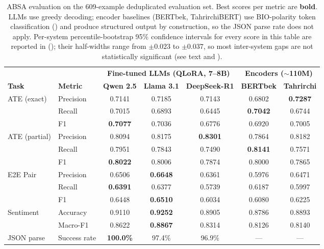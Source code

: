 \documentclass[bdcc,article,submit,moreauthors]{Definitions/mdpi}
\begin{document}
\begin{table}[t]
\centering
\caption{ABSA evaluation on the 609-example deduplicated evaluation set. Best scores per metric are \textbf{bold}. LLMs use greedy decoding; encoder baselines (BERTbek, TahrirchiBERT) use BIO-polarity token classification () and produce structured output by construction, so the JSON parse rate does not apply. Per-system percentile-bootstrap 95\% confidence intervals for every score in this table are reported in  (); their half-widths range from $\pm 0.023$ to $\pm 0.037$, so most inter-system gaps are not statistically significant (see text and ).}
\label{tab:absa_results}
\setlength{\tabcolsep}{2.5pt}
\small
\begin{tabular}{llccccc}
\toprule
& & \multicolumn{3}{c}{\textbf{Fine-tuned LLMs (QLoRA, 7--8B)}} & \multicolumn{2}{c}{\textbf{Encoders ($\sim$110M)}} \\
\cmidrule(lr){3-5}\cmidrule(lr){6-7}
\textbf{Task} & \textbf{Metric} & \textbf{Qwen 2.5} & \textbf{Llama 3.1} & \textbf{DeepSeek-R1} & \textbf{BERTbek} & \textbf{Tahrirchi} \\
\midrule
\multirow{3}{*}{ATE (exact)}
  & Precision & 0.7141 & 0.7185 & 0.7143 & 0.6802 & \textbf{0.7287} \\
  & Recall    & 0.7015 & 0.6893 & 0.6445 & \textbf{0.7042} & 0.6744 \\
  & F1        & \textbf{0.7077} & 0.7036 & 0.6776 & 0.6920 & 0.7005 \\
\midrule
\multirow{3}{*}{ATE (partial)}
  & Precision & 0.8094 & 0.8175 & \textbf{0.8301} & 0.7864 & 0.8182 \\
  & Recall    & 0.7951 & 0.7843 & 0.7490 & \textbf{0.8141} & 0.7571 \\
  & F1        & \textbf{0.8022} & 0.8006 & 0.7874 & 0.8000 & 0.7865 \\
\midrule
\multirow{3}{*}{E2E Pair}
  & Precision & 0.6506 & \textbf{0.6648} & 0.6361 & 0.5976 & 0.6471 \\
  & Recall    & \textbf{0.6391} & 0.6377 & 0.5739 & 0.6187 & 0.5997 \\
  & F1        & 0.6448 & \textbf{0.6510} & 0.6034 & 0.6080 & 0.6225 \\
\midrule
\multirow{2}{*}{Sentiment}
  & Accuracy  & 0.9110 & \textbf{0.9252} & 0.8905 & 0.8786 & 0.8893 \\
  & Macro-F1  & 0.8622 & \textbf{0.8867} & 0.8314 & 0.8126 & 0.8140 \\
\midrule
JSON parse & Success rate & \textbf{100.0\%} & 97.4\% & 96.9\% & --- & --- \\
\bottomrule
\end{tabular}
\end{table}
\end{document}
